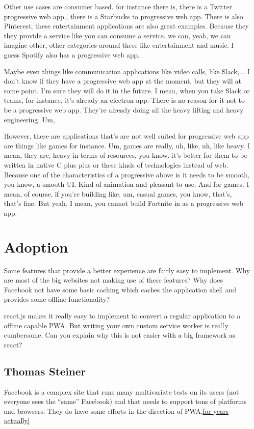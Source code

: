 			 Other use cases are consumer based. for instance there is, there is a Twitter progressive web app., there is a Starbucks to progressive web app. There is also Pinterest, these entertainment applications are also great examples. Because they they provide a service like you can consume a service. we can, yeah, we can imagine other, other categories around these like entertainment and music. I guess Spotify also has a progressive web app. 
				
			 Maybe even things like communication applications like video calls, like Slack,... I don't know if they have a progressive web app at the moment, but they will at some point. I'm sure they will do it in the future. I mean, when you take Slack or teams, for instance, it's already an electron app.  There is no reason for it not to be a progressive web app. They're already doing all the heavy lifting and heavy engineering. Um, 
				
			However, there are applications that's are not well suited for progressive web app are things like games for instance. Um, games are really, uh, like, uh, like heavy. I mean, they are, heavy in terms of resources, you know. it's better for them to be written in native C plus plus or these kinds of technologies instead of web. Because one of the characteristics of a progressive above is it needs to be  smooth, you know, a smooth UI. Kind of animation and pleasant to use. And for games. I mean, of course, if you're building like, um, casual games, you know, that's, that's fine. But yeah, I mean, you cannot build Fortnite in as a progressive web app.
	
	
	\section{Adoption}
		Some features that provide a better experience are fairly easy to implement. 
		Why are most of the big websites not making use of these features?
		Why does Facebook not have some basic caching which caches the application shell and provides some offline functionality?
		
		react.js makes it really easy to implement to convert a regular application to a offline capable PWA. But writing your own custom service worker is really cumbersome. Can you explain why this is not easier with a big framework as react?
		

		\subsection{Thomas Steiner}
			Facebook is a complex site that runs many multivariate tests on its users (not everyone sees the “same” Facebook) and that needs to support tons of platforms and browsers. They do have some efforts in the direction of PWA,\href{https://www.google.com/search?q=facebook+install+pwa&oq=facebook+install+pwa&aqs=chrome..69i57j0l2j69i64l2.4656j0j1&sourceid=chrome&ie=UTF-8}{for years actually]}

